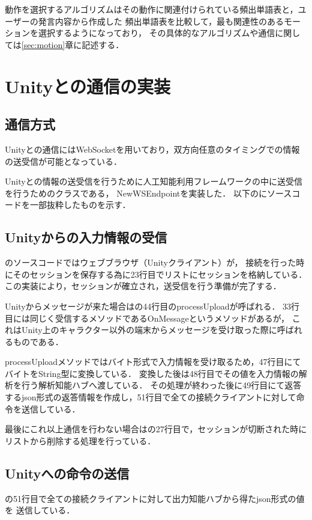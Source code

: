 動作を選択するアルゴリズムはその動作に関連付けられている頻出単語表と，ユーザーの発言内容から作成した
頻出単語表を比較して，最も関連性のあるモーションを選択するようになっており，
その具体的なアルゴリズムや通信に関しては\ref{sec:motion}章に記述する．
\section{Unityとの通信の実装}
\subsection{通信方式}
Unityとの通信にはWebSocketを用いており，双方向任意のタイミングでの情報の送受信が可能となっている．

Unityとの情報の送受信を行うために人工知能利用フレームワークの中に送受信を行うためのクラスである，
NewWSEndpointを実装した．
以下のにソースコードを一部抜粋したものを示す．


\subsection{Unityからの入力情報の受信}
のソースコードではウェブブラウザ（Unityクライアント）が，
接続を行った時にそのセッションを保存する為に23行目でリストにセッションを格納している．
この実装により，セッションが確立され，送受信を行う準備が完了する．

Unityからメッセージが来た場合はの44行目のprocessUploadが呼ばれる．
33行目には同じく受信するメソッドであるOnMessageというメソッドがあるが，
これはUnity上のキャラクター以外の端末からメッセージを受け取った際に呼ばれるものである．

processUploadメソッドではバイト形式で入力情報を受け取るため，47行目にてバイトをString型に変換している．
変換した後は48行目でその値を入力情報の解析を行う解析知能ハブへ渡している．
その処理が終わった後に49行目にて返答するjson形式の返答情報を作成し，51行目で全ての接続クライアントに対して命令を送信している．

最後にこれ以上通信を行わない場合はの27行目で，セッションが切断された時にリストから削除する処理を行っている．

\subsection{Unityへの命令の送信}
の51行目で全ての接続クライアントに対して出力知能ハブから得たjson形式の値を
送信している．

